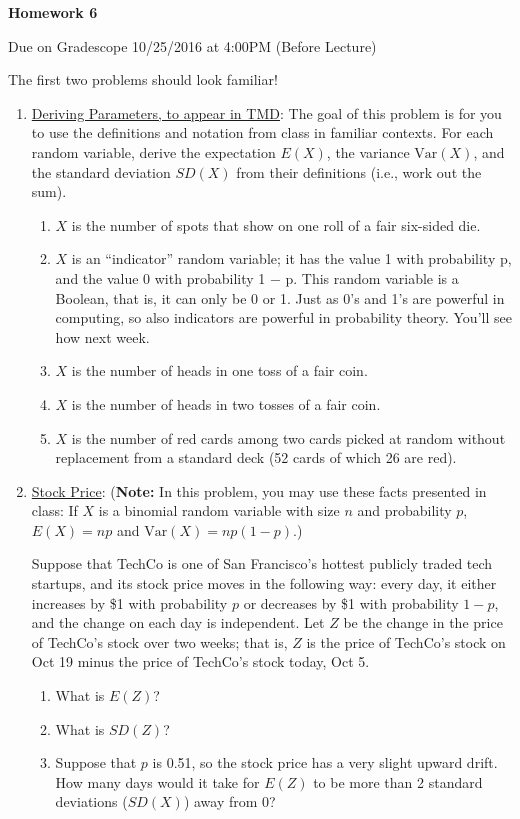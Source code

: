\documentclass[11pt]{article}
\newcommand{\V}{\mathrm{Var}}
\begin{document}
\centerline{\textbf{Homework 6}}
\centerline{Due on Gradescope 10/25/2016 at 4:00PM (Before Lecture)}

The first two problems should look familiar!

\begin{enumerate}
\item \underline{Deriving Parameters, to appear in TMD}:
The goal of this problem is for you to use the definitions and notation from class in familiar
contexts. For each random variable, derive the expectation $E(X)$, the variance $\V(X)$, and the standard deviation $SD(X)$ from their definitions (i.e., work out the sum). 
\begin{enumerate}
\item $X$ is the number of spots that show on one roll of a fair six-sided die.
\item $X$ is an ``indicator'' random variable; it has the value 1 with probability p, and the value 0
with probability 1 − p. This random variable is a Boolean, that is, it can only be 0 or 1. Just as
0’s and 1’s are powerful in computing, so also indicators are powerful in probability theory. You’ll see how next week.
\item $X$ is the number of heads in one toss of a fair coin.
\item $X$ is the number of heads in two tosses of a fair coin.
\item $X$ is the number of red cards among two cards picked at random without replacement from
a standard deck (52 cards of which 26 are red).
\end{enumerate}

\item \underline{Stock Price}:
    ({\bf Note:} In this problem, you may use these facts presented in class: If $X$ is a binomial random variable with size $n$ and probability $p$, $E(X) = np$ and $\V(X) = np(1-p)$.)

Suppose that TechCo is one of San Francisco's hottest publicly traded tech startups, and its stock price moves in the following way: every day, it either increases by \$1 with probability $p$ or decreases by \$1 with probability $1-p$, and the change on each day is independent. Let $Z$ be the change in the price of TechCo's stock over two weeks; that is, $Z$ is the price of TechCo's stock on Oct 19 minus the price of TechCo's stock today, Oct 5.

\begin{enumerate}
    \item What is $E(Z)$?
    \item What is $SD(Z)$?
    \item Suppose that $p$ is 0.51, so the stock price has a very slight upward drift. How many days would it take for $E(Z)$ to be more than 2 standard deviations ($SD(X)$) away from 0?
\end{enumerate}


\end{enumerate}
\end{document}
